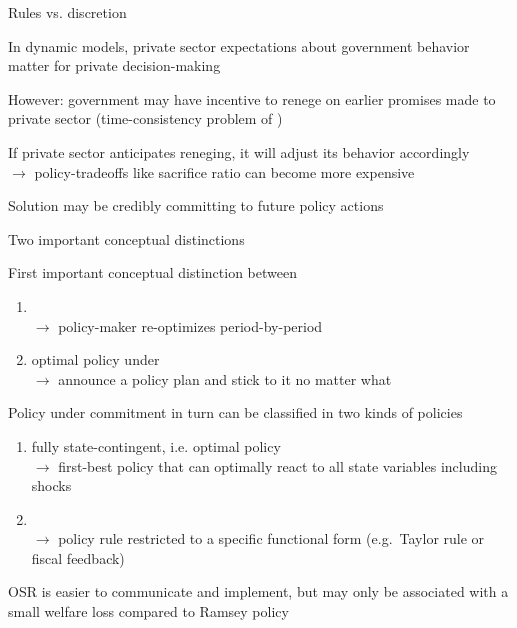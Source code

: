 \documentclass[handout,usepdftitle=false,xcolor=dvipsnames,aspectratio=169]{beamer}
\begin{document}
\begin{frame}{Rules vs. discretion}
  \begin{witemize}
    \item In dynamic models, private sector expectations about government behavior matter for private decision-making \parencite[e.g.][]{Lucas1976}
    \item However: government may have incentive to renege on earlier promises made to private sector (time-consistency problem of \textcite{KydlandPrescott1977})
    \item If private sector anticipates reneging, it will adjust its behavior accordingly\\
    $\rightarrow$ policy-tradeoffs like sacrifice ratio can become more expensive
    \item Solution may be credibly committing to future policy actions
  \end{witemize}
\end{frame}

\begin{frame}{Two important conceptual distinctions}
  \begin{witemize}
    \item First important conceptual distinction between
    \begin{enumerate}
      \item {}\\
            $\rightarrow$ policy-maker re-optimizes period-by-period
      \item optimal policy under \\
            $\rightarrow$ announce a policy plan and stick to it no matter what
    \end{enumerate}
    \item Policy under commitment in turn can be classified in two kinds of policies
    \begin{enumerate}
      \item fully state-contingent, i.e.  optimal policy\\
            $\rightarrow$ first-best policy that can optimally react to all state variables including shocks
      \item {}\\
            $\rightarrow$ policy rule restricted to a specific functional form (e.g.\ Taylor rule or fiscal feedback)
    \end{enumerate}
    \item OSR is easier to communicate and implement, but may only be associated with a small welfare loss compared to Ramsey policy \parencite[e.g.][]{SGU2007}
  \end{witemize}
\end{frame}
\end{document}
